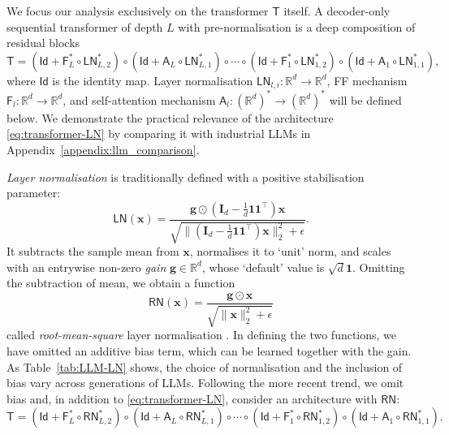 \documentclass[namedate,webpdf,imanum]{ima-authoring-template}
\newcommand{\Real}{\mathbb{R}}
\newcommand{\Matrix}[1]{\mathbf{#1}}
\newcommand{\trans}{\intercal}
\newcommand{\Norm}[3][]{#1\| #2 #1\|_{\mathrm{#3}}}
\newcommand{\hap}{\mathbin{\odot}}
\newcommand{\One}{\Matrix{1}}
\newcommand{\Layer}[1]{\mathsf{#1}}
\newcommand{\Id}{\Layer{Id}}
\numberwithin{equation}{section}
\begin{document}
We focus our analysis exclusively on the transformer $\Layer{T}$ itself.
A decoder-only sequential transformer of depth $L$ with pre-normalisation is a deep composition of residual blocks
\begin{equation}
\label{eq:transformer-LN}
    \Layer{T} = (\Id + \Layer{F}_L^\ast \circ \Layer{LN}_{L,2}^\ast) \circ (\Id + \Layer{A}_L \circ \Layer{LN}_{L,1}^\ast) \circ \cdots \circ (\Id + \Layer{F}_1^\ast \circ \Layer{LN}_{1,2}^\ast) \circ (\Id + \Layer{A}_1 \circ \Layer{LN}_{1,1}^\ast),
\end{equation}
where $\Id$ is the identity map.
Layer normalisation $\Layer{LN}_{l,i} : \Real^d \to \Real^d$, FF mechanism $\Layer{F}_l : \Real^d \to \Real^d$, and self-attention mechanism $\Layer{A}_l : (\Real^d)^\ast \to (\Real^d)^\ast$ will be defined below.
We demonstrate the practical relevance of the architecture \eqref{eq:transformer-LN} by comparing it with industrial LLMs in Appendix~\ref{appendix:llm_comparison}.

\emph{Layer normalisation} \citep{ba2016layer} is traditionally defined with a positive stabilisation parameter:
\begin{equation}
\label{eq:layernorm}
    \Layer{LN}(\Matrix{x}) = \frac{\Matrix{g} \hap (\Matrix{I}_d - \tfrac{1}{d} \One \One^\trans)\Matrix{x}}{\sqrt{\Norm{(\Matrix{I}_d - \tfrac{1}{d} \One \One^\trans)\Matrix{x}}{2}^2 + \epsilon}}.
\end{equation}
It subtracts the sample mean from $\Matrix{x}$, normalises it to `unit' norm, and scales with an entrywise non-zero \emph{gain} $\Matrix{g} \in \Real^d$, whose `default' value is $\sqrt{d} \One$.
Omitting the subtraction of mean, we obtain a function
\begin{equation}
\label{eq:rms-layernorm}
    \Layer{RN}(\Matrix{x}) = \frac{\Matrix{g} \hap \Matrix{x}}{\sqrt{\Norm{\Matrix{x}}{2}^2 + \epsilon}}
\end{equation}
called \emph{root-mean-square} layer normalisation \citep{zhang2019root}.
In defining the two functions, we have omitted an additive bias term, which can be learned together with the gain.
As Table~\ref{tab:LLM-LN} shows, the choice of normalisation and the inclusion of bias vary across generations of LLMs.
Following the more recent trend, we omit bias and, in addition to \eqref{eq:transformer-LN}, consider an architecture with $\Layer{RN}$:
\begin{equation}
\label{eq:transformer-RN}
    \Layer{T} = (\Id + \Layer{F}_L^\ast \circ \Layer{RN}_{L,2}^\ast) \circ (\Id + \Layer{A}_L \circ \Layer{RN}_{L,1}^\ast) \circ \cdots \circ (\Id + \Layer{F}_1^\ast \circ \Layer{RN}_{1,2}^\ast) \circ (\Id + \Layer{A}_1 \circ \Layer{RN}_{1,1}^\ast).
\end{equation}
\end{document}
